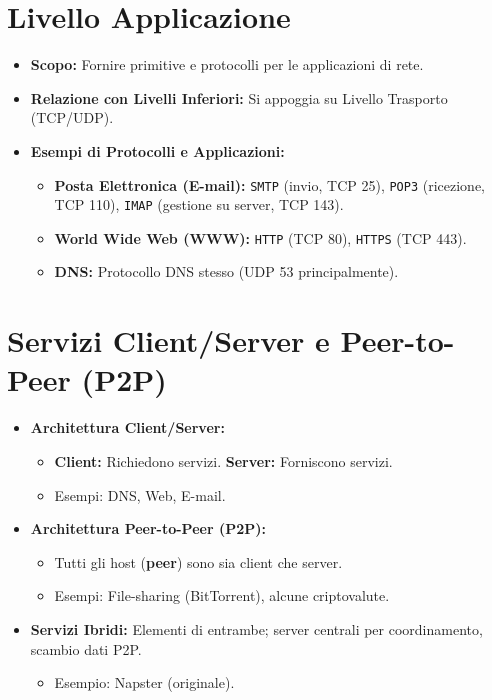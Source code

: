 \section{Livello Applicazione}
\begin{itemize}
    \item \textbf{Scopo:} Fornire primitive e protocolli per le applicazioni di rete.
    \item \textbf{Relazione con Livelli Inferiori:} Si appoggia su Livello Trasporto (TCP/UDP).
    \item \textbf{Esempi di Protocolli e Applicazioni:}
    \begin{itemize}
        \item \textbf{Posta Elettronica (E-mail):} \texttt{SMTP} (invio, TCP 25), \texttt{POP3} (ricezione, TCP 110), \texttt{IMAP} (gestione su server, TCP 143).
        \item \textbf{World Wide Web (WWW):} \texttt{HTTP} (TCP 80), \texttt{HTTPS} (TCP 443).
        \item \textbf{DNS:} Protocollo DNS stesso (UDP 53 principalmente).
    \end{itemize}
\end{itemize}

\section{Servizi Client/Server e Peer-to-Peer (P2P)}
\begin{itemize}
    \item \textbf{Architettura Client/Server:}
    \begin{itemize}
        \item \textbf{Client:} Richiedono servizi. \textbf{Server:} Forniscono servizi.
        \item Esempi: DNS, Web, E-mail.
    \end{itemize}
    \item \textbf{Architettura Peer-to-Peer (P2P):}
    \begin{itemize}
        \item Tutti gli host (\textbf{peer}) sono sia client che server.
        \item Esempi: File-sharing (BitTorrent), alcune criptovalute.
    \end{itemize}
    \item \textbf{Servizi Ibridi:} Elementi di entrambe; server centrali per coordinamento, scambio dati P2P.
    \begin{itemize}
        \item Esempio: Napster (originale).
    \end{itemize}
\end{itemize}

